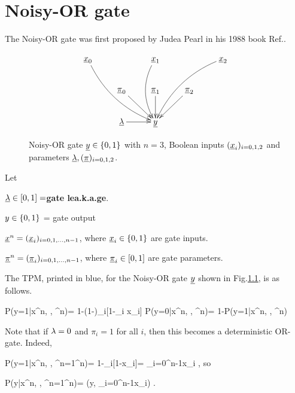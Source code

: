 \chapter{Noisy-OR gate}\label{ch-noisy-or}
The Noisy-OR gate was first
proposed by Judea Pearl in his 1988 book
 Ref.\cite{pearl-1988book}.
\begin{figure}[h!]
$$\xymatrix{
\rvx_0\ar@/_1pc/[ddrr]
&&\rvx_1\ar@/_1pc/[dd]
&&\rvx_2\ar@/_1pc/[ddll]
\\
&\ul{\pi}_0\ar[dr]
&\ul{\pi}_1\ar[d]
&\ul{\pi}_2\ar[dl]
\\
&\ul{\lam}\ar[r]
&\rvy
}$$
\caption{Noisy-OR gate $\rvy\in\bool$
with $n=3$, Boolean inputs $(\rvx_i)_{i=0,1,2}$
and parameters 
$\ul{\lam}, (\ul{\pi})_{i=0,1,2}$.
}
\label{fig-noisy-or-simple}
\end{figure}

Let

$\ul{\lam}\in [0, 1]=${\bf gate lea.k.a.ge}.

$y\in \{0,1\}$ = gate  output

$\rvx^n=(\rvx_i)_{i=0,1, \ldots, n-1}$, where
$\rvx_i\in\bool$ are
 gate inputs.

$\ul{\pi}^n=(\ul{\pi}_i)_{i=0,1, \ldots, n-1}$, where
$\ul{\pi}_i\in[0,1]$ are
 gate parameters.


The TPM, printed in blue,
 for the Noisy-OR gate $\rvy$ 
shown in Fig.\ref{fig-noisy-or-simple},
 is as follows.

\beq\color{blue}
P(y=1|x^n, \lam, \pi^n)=
1-(1-\lam)\prod_i[1-\pi_i x_i]
\label{eq-noisy-or-tmp-1}
\eeq
\beq\color{blue}
P(y=0|x^n, \lam, \pi^n)=
1-P(y=1|x^n, \lam, \pi^n)
\eeq

Note
that if $\lambda=0$ and $\pi_i=1$ for all $i$,
then this becomes 
a deterministic OR-gate. Indeed,

\beq
P(y=1|x^n, , \pi^n=1^n)= 1-\prod_i[1-x_i]=
\V_{i=0}^{n-1}x_i
\;,
\eeq
so 

\beq
P(y|x^n, , \pi^n=1^n)=
\delta(y, \V_{i=0}^{n-1}x_i)
\;.
\eeq

